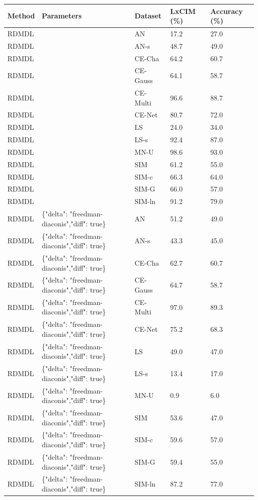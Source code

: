 \begin{tabular}{lllll}
\toprule
Method & Parameters & Dataset & LxCIM (\%) & Accuracy (\%) \\
\midrule
RDMDL &  & AN & 17.2 & 27.0 \\
RDMDL &  & AN-s & 48.7 & 49.0 \\
RDMDL &  & CE-Cha & 64.2 & 60.7 \\
RDMDL &  & CE-Gauss & 64.1 & 58.7 \\
RDMDL &  & CE-Multi & 96.6 & 88.7 \\
RDMDL &  & CE-Net & 80.7 & 72.0 \\
RDMDL &  & LS & 24.0 & 34.0 \\
RDMDL &  & LS-s & 92.4 & 87.0 \\
RDMDL &  & MN-U & 98.6 & 93.0 \\
RDMDL &  & SIM & 61.2 & 55.0 \\
RDMDL &  & SIM-c & 66.3 & 64.0 \\
RDMDL &  & SIM-G & 66.0 & 57.0 \\
RDMDL &  & SIM-ln & 91.2 & 79.0 \\
RDMDL & \{"delta": "freedman-diaconis","diff": true\} & AN & 51.2 & 49.0 \\
RDMDL & \{"delta": "freedman-diaconis","diff": true\} & AN-s & 43.3 & 45.0 \\
RDMDL & \{"delta": "freedman-diaconis","diff": true\} & CE-Cha & 62.7 & 60.7 \\
RDMDL & \{"delta": "freedman-diaconis","diff": true\} & CE-Gauss & 64.7 & 58.7 \\
RDMDL & \{"delta": "freedman-diaconis","diff": true\} & CE-Multi & 97.0 & 89.3 \\
RDMDL & \{"delta": "freedman-diaconis","diff": true\} & CE-Net & 75.2 & 68.3 \\
RDMDL & \{"delta": "freedman-diaconis","diff": true\} & LS & 49.0 & 47.0 \\
RDMDL & \{"delta": "freedman-diaconis","diff": true\} & LS-s & 13.4 & 17.0 \\
RDMDL & \{"delta": "freedman-diaconis","diff": true\} & MN-U & 0.9 & 6.0 \\
RDMDL & \{"delta": "freedman-diaconis","diff": true\} & SIM & 53.6 & 47.0 \\
RDMDL & \{"delta": "freedman-diaconis","diff": true\} & SIM-c & 59.6 & 57.0 \\
RDMDL & \{"delta": "freedman-diaconis","diff": true\} & SIM-G & 59.4 & 55.0 \\
RDMDL & \{"delta": "freedman-diaconis","diff": true\} & SIM-ln & 87.2 & 77.0 \\

\end{tabular}
